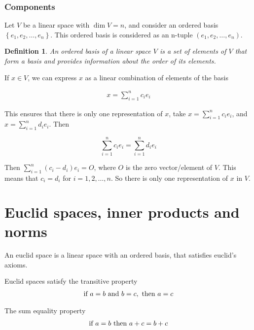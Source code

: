 \documentclass{book}
\newtheorem{definition}{Definition}[chapter]
\begin{document}
\subsection{Components}

Let $V$ be a linear space with $\dim V = n$, and consider an ordered basis
$\left\{e_1, e_2,\dots,e_n\right\}$. This ordered basis is considered as an
n-tuple $\left(e_1,e_2,\dots,e_n\right)$.

\begin{definition}
    An ordered basis of a linear space $V$ is a set of elements of $V$ that form a basis and provides information
    about the order of its elements.
\end{definition}

If $x\in V$, we can express $x$ as a linear combination of elements of the
basis

\begin{equation}
    \begin{split}
        x=\sum_{i=1}^{n}{c_i e_i}
    \end{split}
\end{equation}

This ensures that there is only one representation of $x$, take $x =
    \sum_{i=1}^{n}{c_i e_i}$, and $x = \sum_{i=1}^{n}{d_i e_i}$. Then

\[
    \sum_{i=1}^{n}{c_i e_i} = \sum_{i=1}^{n}{d_i e_i}
\]

Then $\sum_{i=1}^{n}{(c_i - d_i) e_i} = O$, where $O$ is the zero
vector/element of $V$. This means that $c_i=d_i$ for $i=1,2,\dots,n$. So there
is only one representation of $x$ in $V$.

\chapter{Euclid spaces, inner products and norms}

An euclid space is a linear space with an ordered basis, that satisfies
euclid's axioms.

Euclid spaces satisfy the transitive property
\begin{equation*}
    \begin{split}
        \textnormal{if } a=b \textnormal{ and } b=c, \textnormal{ then } a=c
    \end{split}
\end{equation*}

The sum equality property
\begin{equation*}
    \begin{split}
        \textnormal{if } a=b \textnormal{ then } a+c=b+c
    \end{split}
\end{equation*}
\end{document}
